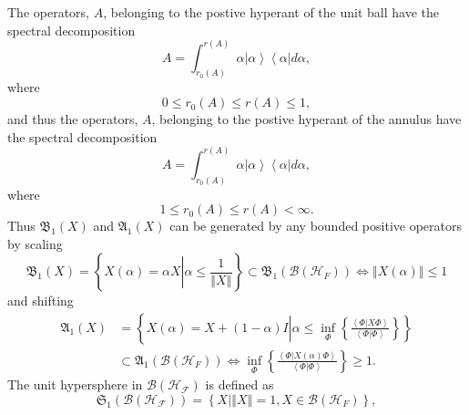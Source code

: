 \documentclass[aps,preprint]{revtex4}%
\begin{document}
The operators, $A$, belonging to the postive hyperant of the unit ball have
the spectral decomposition
\begin{equation}
A=\int_{r_{0}\left(  A\right)  }^{r\left(  A\right)  }\alpha\left\vert
\alpha\right\rangle \left\langle \alpha\right\vert d\alpha,
\end{equation}
where
\begin{equation}
0\leq r_{0}\left(  A\right)  \leq r\left(  A\right)  \leq1,
\end{equation}
and thus the operators, $A$, belonging to the postive hyperant of the annulus
have the spectral decomposition
\begin{equation}
A=\int_{r_{0}\left(  A\right)  }^{r\left(  A\right)  }\alpha\left\vert
\alpha\right\rangle \left\langle \alpha\right\vert d\alpha,
\end{equation}
where
\begin{equation}
1\leq r_{0}\left(  A\right)  \leq r\left(  A\right)  <\infty.
\end{equation}
Thus $\mathfrak{B}_{1}\left(  X\right)  $ and $\mathfrak{A}_{1}\left(
X\right)  $ can be generated by any bounded positive operators by scaling
\begin{equation}
\mathfrak{B}_{1}\left(  X\right)  =\left\{  X\left(  \alpha\right)  =\alpha
X\left\vert \alpha\leq\frac{1}{\left\Vert X\right\Vert }\right.  \right\}
\subset\mathfrak{B}_{1}\left(  \mathcal{B}\left(  \mathcal{H}_{F}\right)
\right)  \Leftrightarrow\left\Vert X\left(  \alpha\right)  \right\Vert \leq1
\end{equation}
and shifting
\begin{align}
\mathfrak{A}_{1}\left(  X\right)   &  =\left\{  X\left(  \alpha\right)
=X+\left(  1-\alpha\right)  I\left\vert \alpha\leq\inf_{\Phi}\left\{
\frac{\left\langle \left.  \Phi\right\vert X\Phi\right\rangle }{\left\langle
\left.  \Phi\right\vert \Phi\right\rangle }\right\}  \right.  \right\}
\nonumber\\
&  \subset\mathfrak{A}_{1}\left(  \mathcal{B}\left(  \mathcal{H}_{F}\right)
\right)  \Leftrightarrow\inf_{\Phi}\left\{  \frac{\left\langle \left.
\Phi\right\vert X\left(  \alpha\right)  \Phi\right\rangle }{\left\langle
\left.  \Phi\right\vert \Phi\right\rangle }\right\}  \geq1.
\end{align}
The unit hypersphere in $\mathcal{B}\left(  \mathcal{H}_{\mathcal{F}}\right)
$ is defined as
\begin{equation}
\mathfrak{S}_{1}\left(  \mathcal{B}\left(  \mathcal{H}_{\mathcal{F}}\right)
\right)  =\left\{  X\left\vert \left\Vert X\right\Vert =1,X\in\mathcal{B}%
\left(  \mathcal{H}_{F}\right)  \right.  \right\}  ,
\end{equation}
\end{document}
